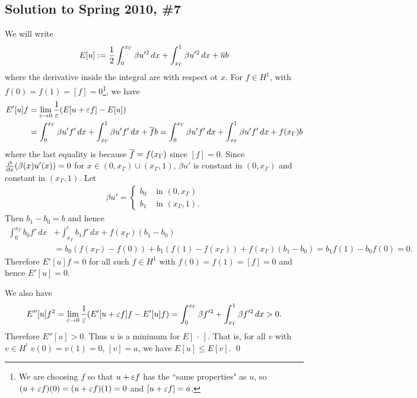 \subsection*{Solution to Spring 2010, \#7}\label{s107}
We will write
$$E[u] := \frac{1}{2}\int_{0}^{x_{\Gamma}}\beta u'^{2}\, dx + \int_{x_{\Gamma}}^{1}\beta u'^{2}\, dx + \overline{u}b$$
where the derivative inside the integral are with respect ot $x$. For $f \in H^{1}$, with $f(0) = f(1) = [f] = 0$\footnote{We are choosing
$f$ so that $u + \varepsilon f$ has the ``same properties" as $u$, so $(u + \varepsilon f)(0) = (u + \varepsilon f)(1) = 0$ and $[u + \varepsilon f] = a$.}, we have
\begin{align*}
E'[u]f &= \lim_{\varepsilon \rightarrow 0}\frac{1}{\varepsilon}(E[u + \varepsilon f] - E[u])\\
&= \int_{0}^{x_{\Gamma}}\beta u'f'\, dx + \int_{x_{\Gamma}}^{1}\beta u'f'\, dx + \overline{f}b = \int_{0}^{x_{\Gamma}}\beta u'f'\, dx + \int_{x_{\Gamma}}^{1}\beta u'f'\, dx + f(x_{\Gamma})b
\end{align*}
where the last equality is because $\overline{f} = f(x_{\Gamma})$ since $[f] = 0$.
Since $\frac{\partial}{\partial x}(\beta(x)u'(x)) = 0$ for $x \in (0, x_{\Gamma}) \cup (x_{\Gamma}, 1)$, $\beta u'$ is constant
in $(0, x_{\Gamma})$ and constant in $(x_{\Gamma}, 1)$. Let
\begin{align*}
\beta u' =
\begin{cases}
b_{0} & \text{ in } (0, x_{\Gamma})\\
b_{1} & \text{ in } (x_{\Gamma}, 1).
\end{cases}
\end{align*}
Then $b_{1} - b_{0} = b$ and hence
\begin{align*}
\int_{0}^{x_{\Gamma}}b_{0}f'\, dx &+ \int_{x_{\Gamma}}^{!}b_{1}f'\, dx + f(x_{\Gamma})(b_{1} - b_{0})\\
&= b_{0}(f(x_{\Gamma}) - f(0)) + b_{1}(f(1) - f(x_{\Gamma})) + f(x_{\Gamma})(b_{1} - b_{0}) = b_{1}f(1) - b_{0}f(0) = 0.
\end{align*}
Therefore $E'[u]f = 0$ for all such $f \in H^{1}$ with $f(0) = f(1) = [f] = 0$ and hence $E'[u] = 0$.

We also have
\begin{align*}
E''[u]f^{2} = \lim_{\varepsilon \rightarrow 0}\frac{1}{\varepsilon}(E'[u + \varepsilon f]f - E'[u]f) = \int_{0}^{x_{\Gamma}}\beta f'^{2} + \int_{x_{\Gamma}}^{1}\beta f'^{2}\, dx > 0.
\end{align*}
Therefore $E''[u] > 0$. Thus $u$ is a minimum for $E[\, \cdot \,]$. That is, for all $v$ with $v \in H^{!}$
$v(0) = v(1) = 0$, $[v] = a$, we have $E[u] \leq E[v]$.
\hfill\qed

